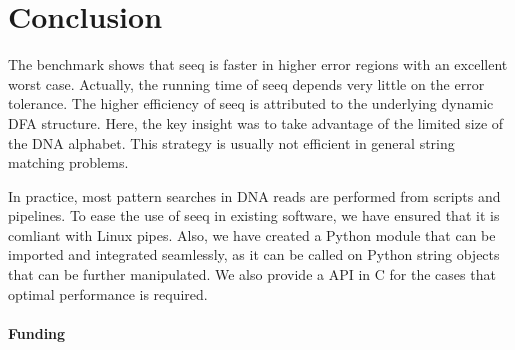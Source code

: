\documentclass{bioinfo}
\begin{document}
\section{Conclusion}

The benchmark shows that seeq is faster in higher error regions with
an excellent worst case. Actually, the running time of seeq depends
very little on the error tolerance. The higher efficiency of seeq
is attributed to the underlying dynamic DFA structure. Here, the key
insight was to take advantage of the limited size of the DNA alphabet.
This strategy is usually not efficient in general string matching
problems.

In practice, most pattern searches in DNA reads are performed from
scripts and pipelines. To ease the use of seeq in existing software,
we have ensured that it is comliant with Linux pipes. Also, we have
created a Python module that can be imported and integrated seamlessly,
as it can be called on Python string objects that can be further
manipulated. We also provide a API in C for the cases that optimal
performance is required.


\paragraph{Funding\textcolon}



%
%
%
%
%
%
%

\end{document}
